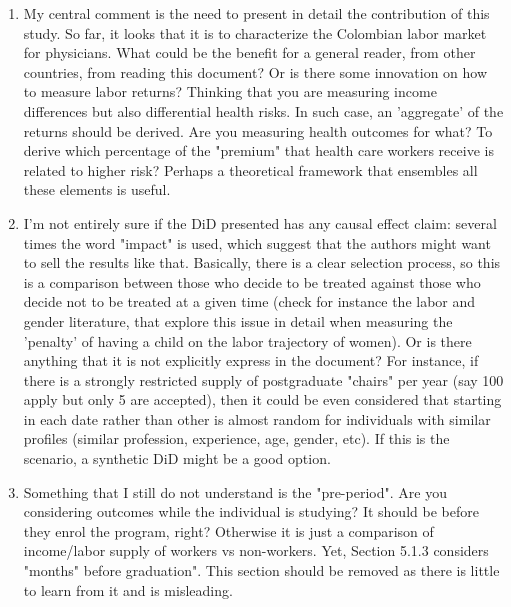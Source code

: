 \documentclass[12pt]{article}
\begin{document}
\begin{enumerate}
    \item My central comment is the need to present in detail the contribution of this study. So far, it looks that it is to characterize the Colombian labor market for physicians. What could be the benefit for a general reader, from other countries, from reading this document? Or is there some innovation on how to measure labor returns? Thinking that you are measuring income differences but also differential health risks. In such case, an 'aggregate' of the returns should be derived. Are you measuring health outcomes for what? To derive which percentage of the "premium" that health care workers receive is related to higher risk? Perhaps a theoretical framework that ensembles all these elements is useful.
    \item I'm not entirely sure if the DiD presented has any causal effect claim: several times the word "impact" is used, which suggest that the authors might want to sell the results like that. Basically, there is a clear selection process, so this is a comparison between those who decide to be treated against those who decide not to be treated at a given time (check for instance the labor and gender literature, that explore this issue in detail when measuring the 'penalty' of having a child on the labor trajectory of women). Or is there anything that it is not explicitly express in the document? For instance, if there is a strongly restricted supply of postgraduate "chairs" per year (say 100 apply but only 5 are accepted), then it could be even considered that starting in each date rather than other is almost random for individuals with similar profiles (similar profession, experience, age, gender, etc). If this is the scenario, a synthetic DiD might be a good option.
    \item Something that I still do not understand is the "pre-period". Are you considering outcomes while the individual is studying? It should be before they enrol the program, right? Otherwise it is just a comparison of income/labor supply of workers vs non-workers. Yet, Section 5.1.3 considers "months" before graduation". This section should be removed as there is little to learn from it and is misleading.
\end{enumerate}
\end{document}
